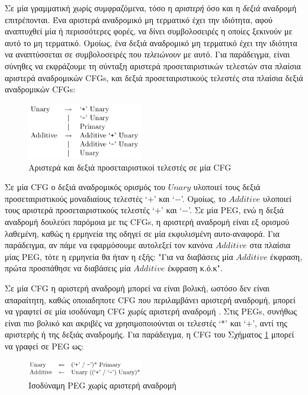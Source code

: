 \documentclass[diploma]{softlab-thesis}
\begin{document}
Σε μία γραμματική χωρίς συμφραζόμενα, τόσο η \textit{αριστερή} όσο και η \textit{δεξιά} αναδρομή επιτρέπονται. 
Ένα αριστερά αναδρομικό μη τερματικό έχει την ιδιότητα, αφού αναπτυχθεί μία ή περισσότερες φορές, να δίνει συμβολοσειρές η οποίες ξεκινούν με αυτό το μη τερματικό. 
Ομοίως, ένα δεξιά αναδρομικό μη τερματικό έχει την ιδιότητα να αναπτύσσεται σε συμβολοσειρές που \textit{τελειώνουν} με αυτό. 
Για παράδειγμα, είναι σύνηθες να εκφράζουμε τη σύνταξη αριστερά προσεταιριστικών τελεστών στα πλαίσια αριστερά αναδρομικών CFGs, και δεξιά προσεταιριστικούς τελεστές στα πλαίσια δεξιά αναδρομικών CFGs:

\begin{figure}[h]
    \centering
	\includegraphics[width=0.45\textwidth]{pics/left_recursion}
	\caption{Αριστερά και δεξιά προσεταιριστικοί τελεστές σε μία CFG}
    \label{fig:left_recursion}
\end{figure}

Σε μία CFG ο δεξιά αναδρομικός ορισμός του $Unary$ υλοποιεί τους δεξιά προσεταιριστικούς μοναδιαίους τελεστές `$+$' και `$-$'.
Ομοίως, το $Additive$ υλοποιεί τους αριστερά προσεταιριστικούς τελεστές `$+$' και `$-$'.
Σε μία PEG, ενώ η δεξιά αναδρομή δουλεύει παρόμοια με τις CFGs, η αριστερή αναδρομή είναι εξ ορισμού λαθεμένη, καθώς η ερμηνεία της οδηγεί σε μία εκφυλισμένη αυτο-αναφορά. 
Για παράδειγμα, αν πάμε να εφαρμόσουμε αυτολεξεί τον κανόνα $Additive$ στα πλαίσια μίας PEG, τότε η ερμηνεία θα ήταν η εξής:
"Για να διαβάσεις μία $Additive$ έκφραση, πρώτα προσπάθησε να διαβάσεις μία $Additive$ έκφραση κ.ό.κ".

Σε μία CFG η αριστερή αναδρομή μπορεί να είναι βολική, ωστόσο δεν είναι απαραίτητη, καθώς οποιαδηποτε CFG που περιλαμβάνει αριστερή αναδρομή, μπορεί να γραφτεί σε μία ισοδύναμη CFG χωρίς αριστερή αναδρομή \cite{Moore2000}. 
Στις PEGs, συνήθως είναι πιο βολικό και ακριβές να χρησιμοποιούνται οι τελεστές `$*$' και `$+$', αντί της αριστερής ή της δεξιάς αναδρομής. 
Για παράδειγμα, η CFG του Σχήματος \ref{fig:left_recursion} μπορεί να γραφεί σε PEG ως:

\begin{figure}[h]
    \centering
	\includegraphics[width=0.45\textwidth]{pics/left_recursion_fix}
	\caption{Ισοδύναμη PEG χωρίς αριστερή αναδρομή}
    \label{fig:left_recursion_fix}
\end{figure}
\end{document}
